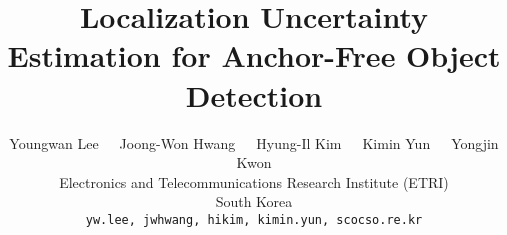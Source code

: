 \documentclass[final]{cvpr}
\begin{document}
\title{Localization Uncertainty Estimation for Anchor-Free Object Detection}




\author{Youngwan Lee\ \ \ Joong-Won Hwang\ \ \ Hyung-Il Kim\ \ \ Kimin Yun\ \ \ Yongjin Kwon\\
  Electronics and Telecommunications Research Institute (ETRI)\\
  South Korea \\
  \tt\small\texttt{\textbraceleft yw.lee, jwhwang, hikim, kimin.yun, scocso\textbraceright@etri.re.kr} \\
}

\maketitle
\end{document}
